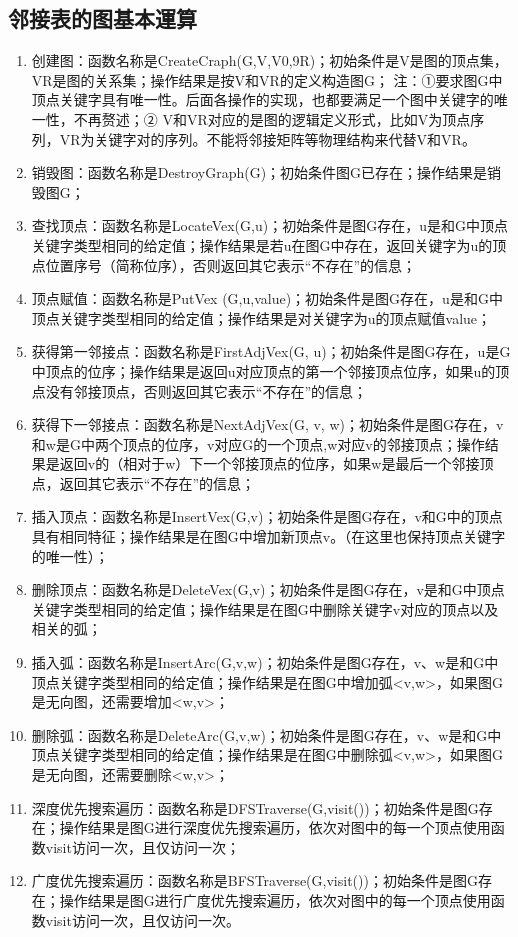 \documentclass[supercite]{Experimental_Report}
\theoremstyle{definition}
\begin{document}
\subsection{邻接表的图基本運算}
\begin{enumerate}
	\item	创建图：函数名称是CreateCraph(G,V,V0,9R)；初始条件是V是图的顶点集，VR是图的关系集；操作结果是按V和VR的定义构造图G；
	注：①要求图G中顶点关键字具有唯一性。后面各操作的实现，也都要满足一个图中关键字的唯一性，不再赘述；② V和VR对应的是图的逻辑定义形式，比如V为顶点序列，VR为关键字对的序列。不能将邻接矩阵等物理结构来代替V和VR。
	\item	销毁图：函数名称是DestroyGraph(G)；初始条件图G已存在；操作结果是销毁图G；
	\item	查找顶点：函数名称是LocateVex(G,u)；初始条件是图G存在，u是和G中顶点关键字类型相同的给定值；操作结果是若u在图G中存在，返回关键字为u的顶点位置序号（简称位序），否则返回其它表示“不存在”的信息；
	\item	顶点赋值：函数名称是PutVex (G,u,value)；初始条件是图G存在，u是和G中顶点关键字类型相同的给定值；操作结果是对关键字为u的顶点赋值value；
	\item	获得第一邻接点：函数名称是FirstAdjVex(G, u)；初始条件是图G存在，u是G中顶点的位序；操作结果是返回u对应顶点的第一个邻接顶点位序，如果u的顶点没有邻接顶点，否则返回其它表示“不存在”的信息；
	\item	获得下一邻接点：函数名称是NextAdjVex(G, v, w)；初始条件是图G存在，v和w是G中两个顶点的位序，v对应G的一个顶点,w对应v的邻接顶点；操作结果是返回v的（相对于w）下一个邻接顶点的位序，如果w是最后一个邻接顶点，返回其它表示“不存在”的信息；
	\item	插入顶点：函数名称是InsertVex(G,v)；初始条件是图G存在，v和G中的顶点具有相同特征；操作结果是在图G中增加新顶点v。（在这里也保持顶点关键字的唯一性）；
	\item	删除顶点：函数名称是DeleteVex(G,v)；初始条件是图G存在，v是和G中顶点关键字类型相同的给定值；操作结果是在图G中删除关键字v对应的顶点以及相关的弧；
	\item	插入弧：函数名称是InsertArc(G,v,w)；初始条件是图G存在，v、w是和G中顶点关键字类型相同的给定值；操作结果是在图G中增加弧<v,w>，如果图G是无向图，还需要增加<w,v>；
	\item	删除弧：函数名称是DeleteArc(G,v,w)；初始条件是图G存在，v、w是和G中顶点关键字类型相同的给定值；操作结果是在图G中删除弧<v,w>，如果图G是无向图，还需要删除<w,v>；
	\item	深度优先搜索遍历：函数名称是DFSTraverse(G,visit())；初始条件是图G存在；操作结果是图G进行深度优先搜索遍历，依次对图中的每一个顶点使用函数visit访问一次，且仅访问一次；
	\item	广度优先搜索遍历：函数名称是BFSTraverse(G,visit())；初始条件是图G存在；操作结果是图G进行广度优先搜索遍历，依次对图中的每一个顶点使用函数visit访问一次，且仅访问一次。
\end{enumerate}
\end{document}
